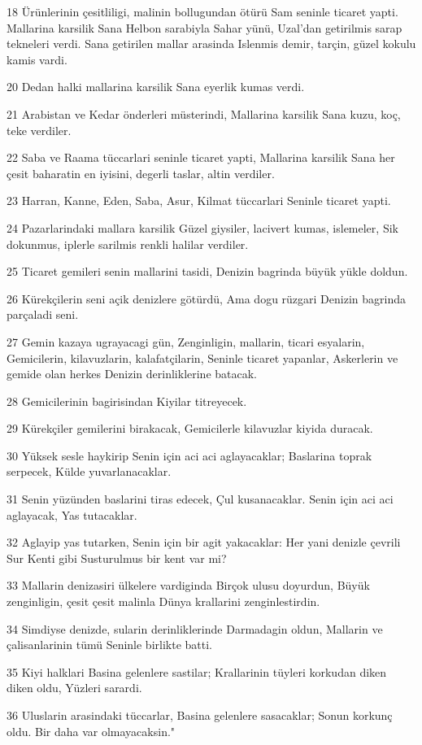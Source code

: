 \par 18 Ürünlerinin çesitliligi, malinin bollugundan ötürü Sam seninle ticaret yapti. Mallarina karsilik Sana Helbon sarabiyla Sahar yünü, Uzal'dan getirilmis sarap tekneleri verdi. Sana getirilen mallar arasinda Islenmis demir, tarçin, güzel kokulu kamis vardi.
\par 20 Dedan halki mallarina karsilik Sana eyerlik kumas verdi.
\par 21 Arabistan ve Kedar önderleri müsterindi, Mallarina karsilik Sana kuzu, koç, teke verdiler.
\par 22 Saba ve Raama tüccarlari seninle ticaret yapti, Mallarina karsilik Sana her çesit baharatin en iyisini, degerli taslar, altin verdiler.
\par 23 Harran, Kanne, Eden, Saba, Asur, Kilmat tüccarlari Seninle ticaret yapti.
\par 24 Pazarlarindaki mallara karsilik Güzel giysiler, lacivert kumas, islemeler, Sik dokunmus, iplerle sarilmis renkli halilar verdiler.
\par 25 Ticaret gemileri senin mallarini tasidi, Denizin bagrinda büyük yükle doldun.
\par 26 Kürekçilerin seni açik denizlere götürdü, Ama dogu rüzgari Denizin bagrinda parçaladi seni.
\par 27 Gemin kazaya ugrayacagi gün, Zenginligin, mallarin, ticari esyalarin, Gemicilerin, kilavuzlarin, kalafatçilarin, Seninle ticaret yapanlar, Askerlerin ve gemide olan herkes Denizin derinliklerine batacak.
\par 28 Gemicilerinin bagirisindan Kiyilar titreyecek.
\par 29 Kürekçiler gemilerini birakacak, Gemicilerle kilavuzlar kiyida duracak.
\par 30 Yüksek sesle haykirip Senin için aci aci aglayacaklar; Baslarina toprak serpecek, Külde yuvarlanacaklar.
\par 31 Senin yüzünden baslarini tiras edecek, Çul kusanacaklar. Senin için aci aci aglayacak, Yas tutacaklar.
\par 32 Aglayip yas tutarken, Senin için bir agit yakacaklar: Her yani denizle çevrili Sur Kenti gibi Susturulmus bir kent var mi?
\par 33 Mallarin denizasiri ülkelere vardiginda Birçok ulusu doyurdun, Büyük zenginligin, çesit çesit malinla Dünya krallarini zenginlestirdin.
\par 34 Simdiyse denizde, sularin derinliklerinde Darmadagin oldun, Mallarin ve çalisanlarinin tümü Seninle birlikte batti.
\par 35 Kiyi halklari Basina gelenlere sastilar; Krallarinin tüyleri korkudan diken diken oldu, Yüzleri sarardi.
\par 36 Uluslarin arasindaki tüccarlar, Basina gelenlere sasacaklar; Sonun korkunç oldu. Bir daha var olmayacaksin."

